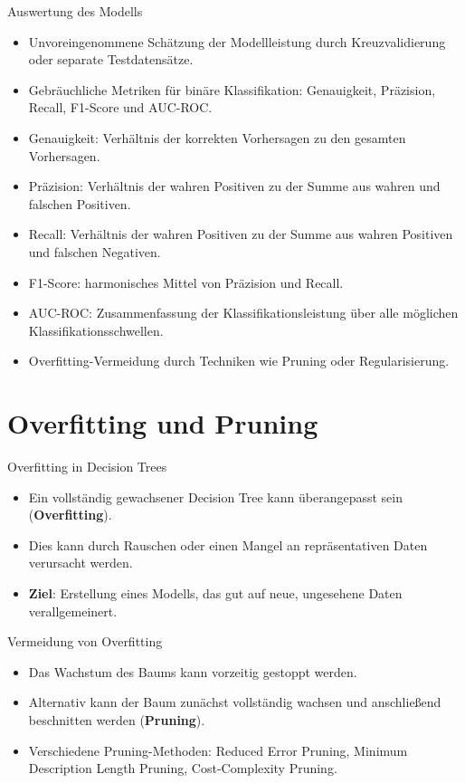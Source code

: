 \documentclass{beamer}
\begin{document}
\begin{frame}{Auswertung des Modells}
	\begin{itemize}
		\item {Unvoreingenommene Schätzung der Modellleistung durch Kreuzvalidierung oder separate Testdatensätze.}
		\item {Gebräuchliche Metriken für binäre Klassifikation: Genauigkeit, Präzision, Recall, F1-Score und AUC-ROC.}
		\item {Genauigkeit: Verhältnis der korrekten Vorhersagen zu den gesamten Vorhersagen.}
		\item {Präzision: Verhältnis der wahren Positiven zu der Summe aus wahren und falschen Positiven.}
		\item {Recall: Verhältnis der wahren Positiven zu der Summe aus wahren Positiven und falschen Negativen.}
		\item {F1-Score: harmonisches Mittel von Präzision und Recall.}
		\item {AUC-ROC: Zusammenfassung der Klassifikationsleistung über alle möglichen Klassifikationsschwellen.}
		\item {Overfitting-Vermeidung durch Techniken wie Pruning oder Regularisierung.}
	\end{itemize}
\end{frame}


\section{Overfitting und Pruning}

\begin{frame}{Overfitting in Decision Trees}
	\begin{itemize}
		\item {Ein vollständig gewachsener Decision Tree kann überangepasst sein (\textbf{Overfitting}).}
		\item {Dies kann durch Rauschen oder einen Mangel an repräsentativen Daten verursacht werden.}
		\item {\textbf{Ziel}: Erstellung eines Modells, das gut auf neue, ungesehene Daten verallgemeinert.}
	\end{itemize}
\end{frame}

\begin{frame}{Vermeidung von Overfitting}
	\begin{itemize}
		\item {Das Wachstum des Baums kann vorzeitig gestoppt werden.}
		\item {Alternativ kann der Baum zunächst vollständig wachsen und anschließend beschnitten werden (\textbf{Pruning}).}
		\item {Verschiedene Pruning-Methoden: Reduced Error Pruning, Minimum Description Length Pruning, Cost-Complexity Pruning.}
	\end{itemize}
\end{frame}
\end{document}
